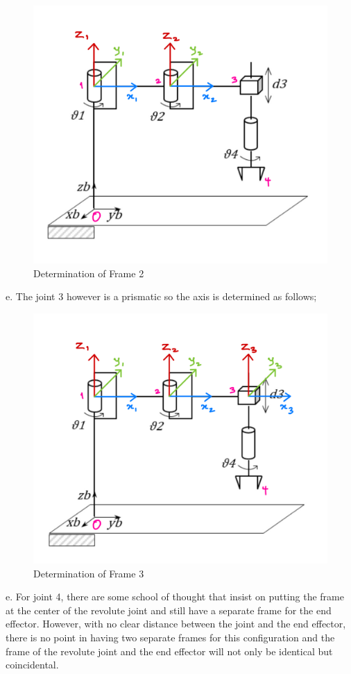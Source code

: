 \documentclass[12pt]{report}
\begin{document}
\begin{figure}[H]
	\centering
	\includegraphics[scale=0.3]{4} %
	\caption{Determination of Frame 2}
	\label{fig:frame2} %
\end{figure}
e. The joint 3 however is a prismatic so the axis is determined as follows;

\begin{figure}[H]
	\centering
	\includegraphics[scale=0.3]{5} %
	\caption{Determination of Frame 3}
	\label{fig:frame3} %
\end{figure}
e. For joint 4, there are some school of thought that insist on putting the frame at the center of the revolute joint and still have a separate frame for the end effector. However, with no clear distance between the joint and the end effector, there is no point in having two separate frames for this configuration and the frame of the revolute joint and the end effector will not only be identical but coincidental.\\
\end{document}
